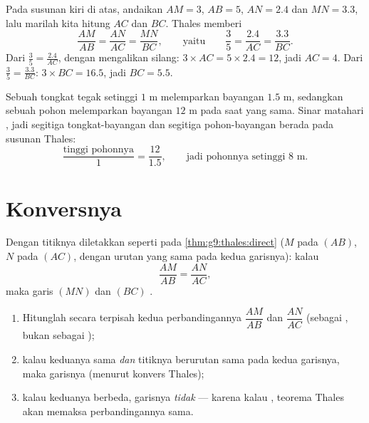 \begin{example}\label{ex:g9:thales:compute}
Pada susunan kiri di atas, andaikan $AM = 3$, $AB = 5$, $AN = 2.4$
dan $MN = 3.3$, lalu marilah kita hitung $AC$ dan $BC$. Thales memberi
\[
\frac{AM}{AB} = \frac{AN}{AC} = \frac{MN}{BC},
\qquad\text{yaitu}\qquad
\frac35 = \frac{2.4}{AC} = \frac{3.3}{BC}.
\]
Dari $\frac35 = \frac{2.4}{AC}$, dengan mengalikan silang:
$3 \times AC = 5 \times 2.4 = 12$, jadi $AC = 4$. Dari
$\frac35 = \frac{3.3}{BC}$: $3 \times BC = 16.5$, jadi $BC = 5.5$.
\end{example}

\begin{example}\label{ex:g9:thales:stick}
Sebuah tongkat tegak setinggi $1$ m melemparkan bayangan $1.5$ m,
sedangkan sebuah pohon melemparkan bayangan $12$ m pada saat yang
sama. Sinar matahari , jadi segitiga tongkat-bayangan dan
segitiga pohon-bayangan berada pada susunan Thales:
\[
\frac{\text{tinggi pohonnya}}{1} = \frac{12}{1.5},
\qquad\text{jadi pohonnya setinggi } 8 \text{ m.}
\]
\end{example}

\section{Konversnya}

\begin{theorem}\label{thm:g9:thales:converse}
Dengan titiknya diletakkan seperti pada \cref{thm:g9:thales:direct}
($M$ pada $(AB)$, $N$ pada $(AC)$, dengan urutan yang sama pada kedua
garisnya): kalau
\[
\frac{AM}{AB} = \frac{AN}{AC},
\]
maka garis $(MN)$ dan $(BC)$ .
\end{theorem}
\admitted

\begin{method}\label{met:g9:thales:converse}
\begin{enumerate}
  \item Hitunglah secara terpisah kedua perbandingannya
        $\dfrac{AM}{AB}$ dan $\dfrac{AN}{AC}$ (sebagai , bukan
        sebagai );
  \item kalau keduanya sama \emph{dan} titiknya berurutan sama pada
        kedua garisnya, maka garisnya  (menurut konvers Thales);
  \item kalau keduanya berbeda, garisnya \emph{tidak}  ---
        karena kalau , teorema Thales akan memaksa
        perbandingannya sama.
\end{enumerate}
\end{method}

